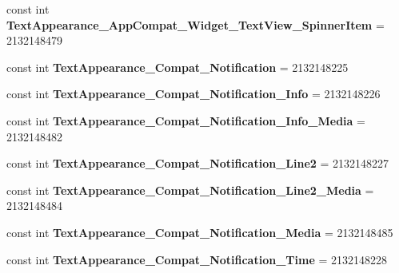 \begin{DoxyCompactItemize}
const int {\bfseries Text\+Appearance\+\_\+\+App\+Compat\+\_\+\+Widget\+\_\+\+Text\+View\+\_\+\+Spinner\+Item} = 2132148479
\item 
\mbox{\label{classst_delivery_1_1_resource_1_1_style_aa1a21b85ef70a89ab361d160a426c04f}} 
const int {\bfseries Text\+Appearance\+\_\+\+Compat\+\_\+\+Notification} = 2132148225
\item 
\mbox{\label{classst_delivery_1_1_resource_1_1_style_a0c710a1f502b3f839e63ded211ed2f6f}} 
const int {\bfseries Text\+Appearance\+\_\+\+Compat\+\_\+\+Notification\+\_\+\+Info} = 2132148226
\item 
\mbox{\label{classst_delivery_1_1_resource_1_1_style_aadca7eff27305997cc1465178b49ebef}} 
const int {\bfseries Text\+Appearance\+\_\+\+Compat\+\_\+\+Notification\+\_\+\+Info\+\_\+\+Media} = 2132148482
\item 
\mbox{\label{classst_delivery_1_1_resource_1_1_style_a8ee4ae8df729ee10e6884228bfc63b4e}} 
const int {\bfseries Text\+Appearance\+\_\+\+Compat\+\_\+\+Notification\+\_\+\+Line2} = 2132148227
\item 
\mbox{\label{classst_delivery_1_1_resource_1_1_style_a0d6f48dbf83f0658c3c4184f5094d94e}} 
const int {\bfseries Text\+Appearance\+\_\+\+Compat\+\_\+\+Notification\+\_\+\+Line2\+\_\+\+Media} = 2132148484
\item 
\mbox{\label{classst_delivery_1_1_resource_1_1_style_a3401dbd91c03b6a4f43a7ca0cdac01bc}} 
const int {\bfseries Text\+Appearance\+\_\+\+Compat\+\_\+\+Notification\+\_\+\+Media} = 2132148485
\item 
\mbox{\label{classst_delivery_1_1_resource_1_1_style_af662d002b3c8db85f265179b764db3da}} 
const int {\bfseries Text\+Appearance\+\_\+\+Compat\+\_\+\+Notification\+\_\+\+Time} = 2132148228
\item 
\mbox{\label{classst_delivery_1_1_resource_1_1_style_aa459fd0f619ea420a461738126fa071d}} 

\end{DoxyCompactItemize}
